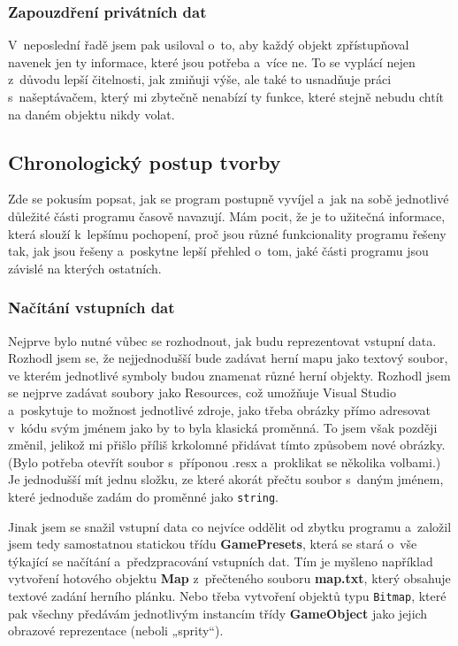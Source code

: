 \documentclass[a4]{article}
\begin{document}
\subsubsection{Zapouzdření privátních dat}
V~neposlední řadě jsem pak usiloval o~to, aby každý objekt zpřístupňoval navenek jen ty informace, které jsou potřeba a~více ne. To se vyplácí nejen z~důvodu lepší čitelnosti, jak zmiňuji výše, ale také to usnadňuje práci s~našeptávačem, který mi zbytečně nenabízí ty funkce, které stejně nebudu chtít na daném objektu nikdy volat.

\subsection{Chronologický postup tvorby}
Zde se pokusím popsat, jak se program postupně vyvíjel a~jak na sobě jednotlivé důležité části programu časově navazují. Mám pocit, že je to užitečná informace, která slouží k~lepšímu pochopení, proč jsou různé funkcionality programu řešeny tak, jak jsou řešeny a~poskytne lepší přehled o~tom, jaké části programu jsou závislé na kterých ostatních.

\subsubsection{Načítání vstupních dat}
Nejprve bylo nutné vůbec se rozhodnout, jak budu reprezentovat vstupní data. Rozhodl jsem se, že nejjednodušší bude zadávat herní mapu jako textový soubor, ve kterém jednotlivé symboly budou znamenat různé herní objekty. Rozhodl jsem se nejprve zadávat soubory jako Resources, což umožňuje Visual Studio a~poskytuje to možnost jednotlivé zdroje, jako třeba obrázky přímo adresovat v~kódu svým jménem jako by to byla klasická proměnná. To jsem však později změnil, jelikož mi přišlo příliš krkolomné přidávat tímto způsobem nové obrázky. (Bylo potřeba otevřít soubor s~příponou .resx a~proklikat se několika volbami.) Je jednodušší mít jednu složku, ze které akorát přečtu soubor s~daným jménem, které jednoduše zadám do proměnné jako \verb|string|.

Jinak jsem se snažil vstupní data co nejvíce oddělit od zbytku programu a~založil jsem tedy samostatnou statickou třídu \textbf{GamePresets}, která se stará o~vše týkající se načítání a~předzpracování vstupních dat. Tím je myšleno například vytvoření hotového objektu \textbf{Map} z~přečteného souboru \textbf{map.txt}, který obsahuje textové zadání herního plánku. Nebo třeba vytvoření objektů typu \verb|Bitmap|, které pak všechny předávám jednotlivým instancím třídy \textbf{GameObject} jako jejich obrazové reprezentace (neboli „sprity“).
\end{document}
